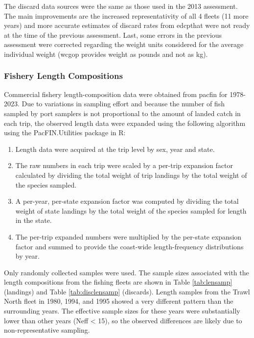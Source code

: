 \documentclass[11pt,
  english,
  letterpaper,
]{article}
\providecommand{\tightlist}{%
  \setlength{\itemsep}{0pt}\setlength{\parskip}{0pt}}
\providecommand{\tightlist}{%
  \setlength{\itemsep}{0pt}\setlength{\parskip}{0pt}}
\begin{document}
The discard data sources were the same as those used in the 2013 assessment. The main improvements are the increased representativity of all 4 fleets (11 more years) and more accurate estimates of discard rates from \gls{edcp}that were not ready at the time of the previous assessment. Last, some errors in the previous assessment were corrected regarding the weight units considered for the average individual weight (\gls{wcgop} provides weight as pounds and not as kg).

\hypertarget{fishery-length-compositions}{%
\subsubsection{Fishery Length Compositions}\label{fishery-length-compositions}}

Commercial fishery length-composition data were obtained from \gls{pacfin} for 1978-2023. Due to variations in sampling effort and because the number of fish sampled by port samplers is not proportional to the amount of landed catch in each trip, the observed length data were expanded using the following algorithm using the PacFIN.Utilities package in R:

\begin{enumerate}
\def\labelenumi{\arabic{enumi}.}
\tightlist
\item
  Length data were acquired at the trip level by sex, year and state.
\item
  The raw numbers in each trip were scaled by a per-trip expansion factor calculated by dividing the total weight of trip landings by the total weight of the species sampled.
\item
  A per-year, per-state expansion factor was computed by dividing the total weight of state landings by the total weight of the species sampled for length in the state.
\item
  The per-trip expanded numbers were multiplied by the per-state expansion factor and summed to provide the coast-wide length-frequency distributions by year.
\end{enumerate}

Only randomly collected samples were used. The sample sizes associated with the length compositions from the fishing fleets are shown in Table \ref{tab:lensamp} (landings) and Table \ref{tab:disclensamp} (discards). Length samples from the Trawl North fleet in 1980, 1994, and 1995 showed a very different pattern than the surrounding years. The effective sample sizes for these years were substantially lower than other years (Neff \textless{} 15), so the observed differences are likely due to non-representative sampling.
\end{document}

